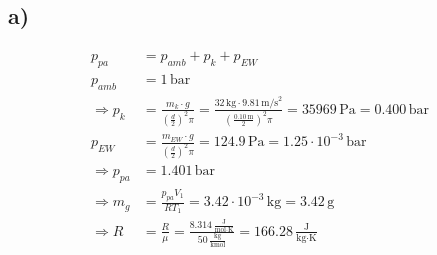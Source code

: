 

\subsection*{a)}

\begin{align*}
    p_{pa} &= p_{amb} + p_k + p_{EW} \\
    p_{amb} &= 1 \, \text{bar} \\
    \Rightarrow p_k &= \frac{m_k \cdot g}{\left(\frac{d}{2}\right)^2 \pi} = \frac{32 \, \text{kg} \cdot 9.81 \, \text{m/s}^2}{\left(\frac{0.10 \, \text{m}}{2}\right)^2 \pi} = 35969 \, \text{Pa} = 0.400 \, \text{bar} \\
    p_{EW} &= \frac{m_{EW} \cdot g}{\left(\frac{d}{2}\right)^2 \pi} = 124.9 \, \text{Pa} = 1.25 \cdot 10^{-3} \, \text{bar} \\
    \Rightarrow p_{pa} &= 1.401 \, \text{bar} \\
    \Rightarrow m_g &= \frac{p_{pa} V_1}{R T_1} = 3.42 \cdot 10^{-3} \, \text{kg} = 3.42 \, \text{g} \\
    \Rightarrow R &= \frac{R}{\mu} = \frac{8.314 \, \frac{\text{J}}{\text{mol} \cdot \text{K}}}{50 \, \frac{\text{kg}}{\text{kmol}}} = 166.28 \, \frac{\text{J}}{\text{kg} \cdot \text{K}}
\end{align*}